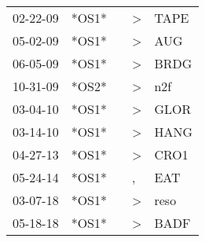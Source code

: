 \begin{supertabular}{p{0.07\textwidth}p{0.06\textwidth}p{0.02\textwidth}p{0.02\textwidth}p{0.06\textwidth}}
          02-22-09\textsuperscript{} &  *OS1* &   &     \textgreater &           TAPE\textsuperscript{} \\
          05-02-09\textsuperscript{} &  *OS1* &   &     \textgreater &            AUG\textsuperscript{} \\
          06-05-09\textsuperscript{} &  *OS1* &   &     \textgreater &           BRDG\textsuperscript{} \\
          10-31-09\textsuperscript{} &  *OS2* &   &     \textgreater &            n2f\textsuperscript{} \\
          03-04-10\textsuperscript{} &  *OS1* &   &     \textgreater &           GLOR\textsuperscript{} \\
          03-14-10\textsuperscript{} &  *OS1* &   &     \textgreater &           HANG\textsuperscript{} \\
          04-27-13\textsuperscript{} &  *OS1* &   &     \textgreater &           CRO1\textsuperscript{} \\
          05-24-14\textsuperscript{} &  *OS1* &   &                , &            EAT\textsuperscript{} \\
          03-07-18\textsuperscript{} &  *OS1* &   &     \textgreater &           reso\textsuperscript{} \\
          05-18-18\textsuperscript{} &  *OS1* &   &     \textgreater &           BADF\textsuperscript{} \\
\end{supertabular}
